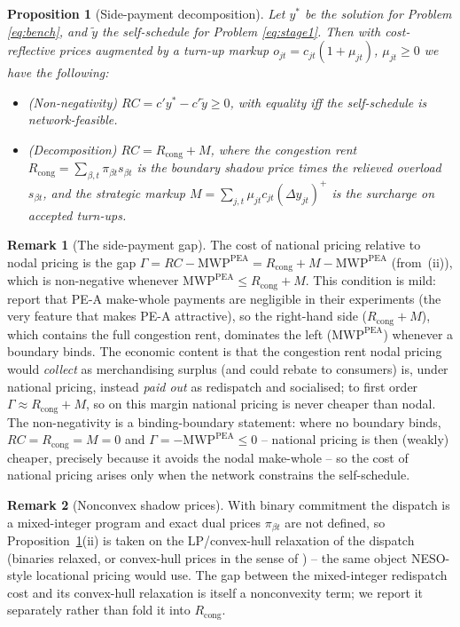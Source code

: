 \documentclass[review,3p,times]{elsarticle}
\theoremstyle{plain}
\newtheorem{proposition}{Proposition}
\theoremstyle{definition}
\newtheorem{remark}{Remark}
\begin{document}
\begin{proposition}[Side-payment decomposition]
\label{prop:p2}
Let $y^*$ be the solution for Problem \ref{eq:bench}, and $\tilde y$ the self-schedule for Problem \ref{eq:stage1}. Then with cost-reflective prices augmented by a turn-up markup
$o_{jt}=c_{jt}(1+\mu_{jt})$, $\mu_{jt}\ge0$ we have the following:
\begin{itemize}
\item[\emph{(i)}] \emph{(Non-negativity)} $RC=c'y^\ast-c'\tilde y\ge0$, with
equality iff the self-schedule is network-feasible.
\item[\emph{(ii)}] \emph{(Decomposition)} $RC=R_{\mathrm{cong}}+M$, where the
congestion rent $R_{\mathrm{cong}}=\sum_{\beta,t}\pi_{\beta t}s_{\beta t}$ is the
boundary shadow price times the relieved overload $s_{\beta t}$, and the strategic
markup $M=\sum_{j,t}\mu_{jt}c_{jt}(\Delta y_{jt})^{+}$ is the surcharge on
accepted turn-ups.
\end{itemize}
\end{proposition}

\begin{remark}[The side-payment gap]
\label{rem:gap}
The cost of national pricing relative to nodal pricing is the gap
$\Gamma=RC-\mathrm{MWP}^{\mathrm{PEA}}
=R_{\mathrm{cong}}+M-\mathrm{MWP}^{\mathrm{PEA}}$ (from~(ii)), which is
non-negative whenever $\mathrm{MWP}^{\mathrm{PEA}}\le R_{\mathrm{cong}}+M$. This
condition is mild: \citet{bichler2022} report that PE-A make-whole payments are
negligible in their experiments (the very feature that makes PE-A attractive), so
the right-hand side ($R_{\mathrm{cong}}+M$), which contains the full congestion rent, dominates the left ($\mathrm{MWP}^{\mathrm{PEA}}$)
whenever a boundary binds. The economic content is that the congestion rent nodal
pricing would \emph{collect} as merchandising surplus (and could rebate to
consumers) is, under national pricing, instead \emph{paid out} as redispatch and
socialised; to first order $\Gamma\approx R_{\mathrm{cong}}+M$, so on this margin
national pricing is never cheaper than nodal. The non-negativity is a
binding-boundary statement: where no boundary binds, $RC=R_{\mathrm{cong}}=M=0$ and
$\Gamma=-\mathrm{MWP}^{\mathrm{PEA}}\le0$ -- national pricing is then (weakly)
cheaper, precisely because it avoids the nodal make-whole -- so the cost of
national pricing arises only when the network constrains the self-schedule.
\end{remark}

\begin{remark}[Nonconvex shadow prices]
\label{rem:nonconvex}
With binary commitment the dispatch is a mixed-integer program and exact dual
prices $\pi_{\beta t}$ are not defined, so Proposition~\ref{prop:p2}(ii) is taken
on the LP/convex-hull relaxation of the dispatch (binaries relaxed, or convex-hull
prices in the sense of \citep{gribik2007}) -- the same object NESO-style
locational pricing would use. The gap between the mixed-integer redispatch cost
and its convex-hull relaxation is itself a nonconvexity term; we report it
separately rather than fold it into $R_{\mathrm{cong}}$.
\end{remark}
\end{document}
